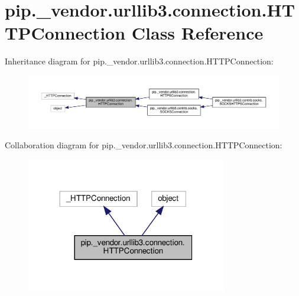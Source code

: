 \hypertarget{classpip_1_1__vendor_1_1urllib3_1_1connection_1_1HTTPConnection}{}\section{pip.\+\_\+vendor.\+urllib3.\+connection.\+H\+T\+T\+P\+Connection Class Reference}
\label{classpip_1_1__vendor_1_1urllib3_1_1connection_1_1HTTPConnection}


Inheritance diagram for pip.\+\_\+vendor.\+urllib3.\+connection.\+H\+T\+T\+P\+Connection\+:
\nopagebreak
\begin{figure}[H]
\begin{center}
\leavevmode
\includegraphics[width=350pt]{classpip_1_1__vendor_1_1urllib3_1_1connection_1_1HTTPConnection__inherit__graph}
\end{center}
\end{figure}


Collaboration diagram for pip.\+\_\+vendor.\+urllib3.\+connection.\+H\+T\+T\+P\+Connection\+:
\nopagebreak
\begin{figure}[H]
\begin{center}
\leavevmode
\includegraphics[width=248pt]{classpip_1_1__vendor_1_1urllib3_1_1connection_1_1HTTPConnection__coll__graph}
\end{center}
\end{figure}
